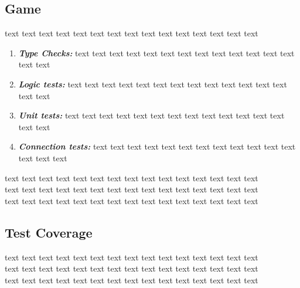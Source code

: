 \documentclass[12pt]{report}
\begin{document}
\subsection*{Game}
text text text text text text text text text text text text text text text\\
\begin{enumerate}
\item \emph{\textbf{Type Checks:}} text text text text text text text text text text text text text text text\\
\item \emph{\textbf{Logic tests:}} text text text text text text text text text text text text text text text\\
\item \emph{\textbf{Unit tests:}} text text text text text text text text text text text text text text text\\
\item \emph{\textbf{Connection tests:}} text text text text text text text text text text text text text text text\\
\end{enumerate}
text text text text text text text text text text text text text text text\\text text text text text text text text text text text text text text text\\text text text text text text text text text text text text text text text\\
\subsection*{Test Coverage}
text text text text text text text text text text text text text text text\\text text text text text text text text text text text text text text text\\text text text text text text text text text text text text text text text\\
\end{document}
